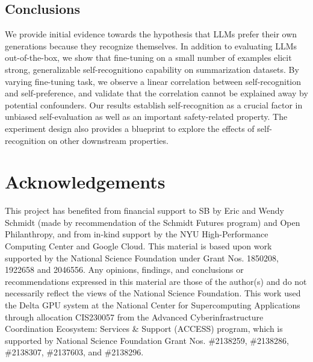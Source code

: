 \documentclass{article}
\theoremstyle{plain}
\theoremstyle{definition}
\theoremstyle{remark}
\begin{document}
\subsection{Conclusions}

We provide initial evidence towards the hypothesis that LLMs prefer their own generations because they recognize themselves.
In addition to evaluating LLMs out-of-the-box, we show that fine-tuning on a small number of examples elicit strong, generalizable self-recognitiono capability on summarization datasets.
By varying fine-tuning task, we observe a linear correlation between self-recognition and self-preference, and validate that the correlation cannot be explained away by potential confounders.
Our results establish self-recognition as a crucial factor in unbiased self-evaluation as well as an important safety-related property.
The experiment design also provides a blueprint to explore the effects of self-recognition on other downstream properties.

\section*{Acknowledgements}

This project has benefited from financial support to SB by Eric and Wendy Schmidt (made by recommendation of the Schmidt Futures program) and Open Philanthropy, and from in-kind support by the NYU High-Performance Computing Center and Google Cloud. This material is based upon work supported by the National Science Foundation under Grant Nos. 1850208,  1922658 and 2046556. Any opinions, findings, and conclusions or recommendations expressed in this material are those of the author(s) and do not necessarily reflect the views of the National Science Foundation. 
This work used the Delta GPU system at the National Center for Supercomputing Applications through allocation CIS230057 from the Advanced Cyberinfrastructure Coordination Ecosystem: Services \& Support (ACCESS) program, which is supported by National Science Foundation Grant Nos. \#2138259, \#2138286, \#2138307, \#2137603, and \#2138296.

%
% 





\clearpage
\appendix
\onecolumn
\end{document}
